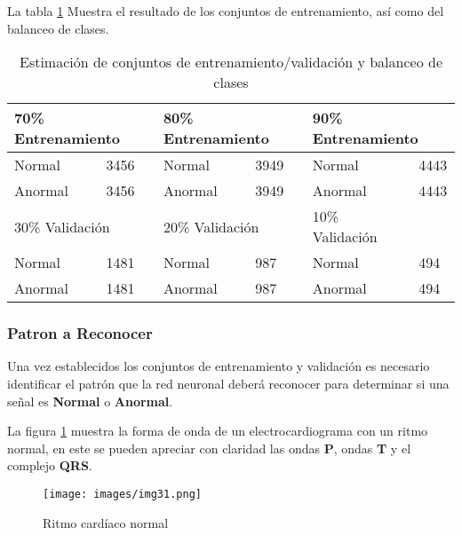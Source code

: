 La tabla \ref{tab:Sets} Muestra el resultado de los conjuntos de entrenamiento, así como del balanceo de clases.

\begin{table}[!ht]
    \centering
    \caption{Estimación de conjuntos de entrenamiento/validación y balanceo de clases}
    \label{tab:Sets}
    \begin{tabular}{lllllll}
        \hline
        \multicolumn{3}{l}{70\% Entrenamiento} & \multicolumn{2}{l}{80\% Entrenamiento} & \multicolumn{2}{l}{90\% Entrenamiento}                         \\ \hline
        Normal                                 & \multicolumn{2}{l}{3456}               & Normal                                 & 3949 & Normal  & 4443 \\ \hline
        Anormal                                & \multicolumn{2}{l}{3456}               & Anormal                                & 3949 & Anormal & 4443 \\ \hline
        \multicolumn{3}{l}{30\% Validación}    & \multicolumn{2}{l}{20\% Validación}    & 10\% Validación                        &                       \\ \hline
        Normal                                 & \multicolumn{2}{l}{1481}               & Normal                                 & 987  & Normal  & 494  \\ \hline
        Anormal                                & \multicolumn{2}{l}{1481}               & Anormal                                & 987  & Anormal & 494  \\ \hline
    \end{tabular}
\end{table}

\subsubsection[short]{Patron a Reconocer}
Una vez establecidos los conjuntos de entrenamiento y validación es necesario identificar el patrón que la red neuronal deberá reconocer para determinar si una señal es \textbf{Normal} o \textbf{Anormal}.

La figura \ref{fig:Norm_Rithm} muestra la forma de onda de un electrocardiograma con un ritmo normal, en este se pueden apreciar con claridad las ondas \textbf{P}, ondas \textbf{T} y el complejo \textbf{QRS}.

\begin{figure}
    \centering
    \texttt{[image: images/img31.png]}
    \caption{Ritmo cardíaco normal}
    \label{fig:Norm_Rithm}
\end{figure}

